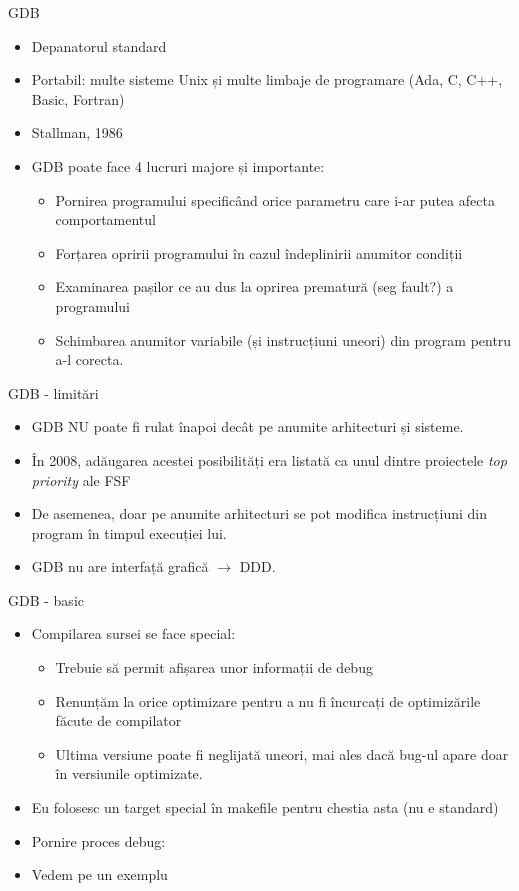 \documentclass{beamer}
\begin{document}
\begin{frame}{GDB}
\begin{itemize}
\item Depanatorul standard
\item Portabil: multe sisteme Unix și multe limbaje de programare (Ada, C, C++, Basic, Fortran)
\item Stallman, 1986
\item \pause GDB poate face 4 lucruri majore și importante:
\begin{itemize}
\item \pause Pornirea programului specificând orice parametru care i-ar putea afecta comportamentul
\item \pause Forțarea opririi programului în cazul îndeplinirii anumitor condiții
\item \pause Examinarea pașilor ce au dus la oprirea prematură (seg fault?) a programului
\item \pause Schimbarea anumitor variabile (și instrucțiuni uneori) din program pentru a-l corecta.
\end{itemize}
\end{itemize}
\end{frame}

\begin{frame}{GDB - limitări}
\begin{itemize}
\item GDB NU poate fi rulat înapoi \pause decât pe anumite arhitecturi și sisteme.
\item \pause În 2008, adăugarea acestei posibilități era listată ca unul dintre proiectele \textit{top priority} ale FSF
\item \pause De asemenea, doar pe anumite arhitecturi se pot modifica instrucțiuni din program în timpul execuției lui.
\item \pause GDB nu are interfață grafică $\rightarrow$ DDD.
\end{itemize}
\end{frame}

\begin{frame}{GDB - basic}
\begin{itemize}
\item Compilarea sursei se face special:
\begin{itemize}\item Trebuie să permit afișarea unor informații de debug 
\item Renunțăm la orice optimizare pentru a nu fi încurcați de optimizările făcute de compilator
\item \pause Ultima versiune poate fi neglijată uneori, mai ales dacă bug-ul apare doar în versiunile optimizate.
\end{itemize}
\item \pause Eu folosesc un target special în makefile pentru chestia asta (nu e standard)
\item \pause Pornire proces debug:
\item \pause Vedem pe un exemplu
\end{itemize}
\end{frame}
\end{document}
